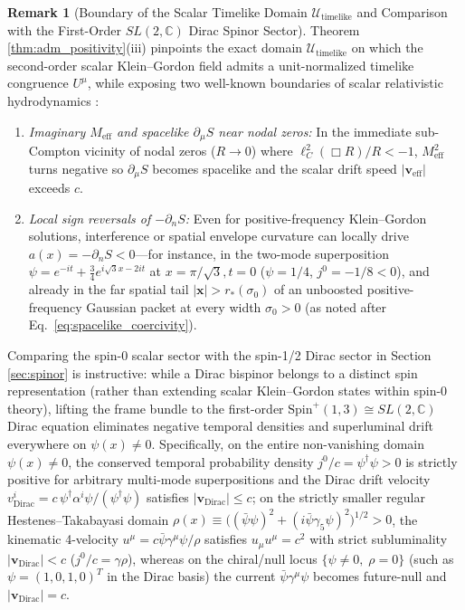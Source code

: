 \documentclass[11pt, a4paper]{article}
\theoremstyle{definition}
\newtheorem{remark}[theorem]{Remark}
\begin{document}
\begin{remark}[Boundary of the Scalar Timelike Domain $\mathcal{U}_{\text{timelike}}$ and Comparison with the First-Order $SL(2,\mathbb{C})$ Dirac Spinor Sector]
\label{rem:subcompton_spinor_bridge}
\label{rem:compton_spinor_bridge}
Theorem \ref{thm:adm_positivity}(iii) pinpoints the exact domain $\mathcal{U}_{\text{timelike}}$ on which the second-order scalar Klein--Gordon field admits a unit-normalized timelike congruence $U^\mu$, while exposing two well-known boundaries of scalar relativistic hydrodynamics \cite{Takabayasi1952, Bohm1952}:
\begin{enumerate}[label=\arabic*., nosep]
    \item \textit{Imaginary $M_{\text{eff}}$ and spacelike $\partial_\mu S$ near nodal zeros:} In the immediate sub-Compton vicinity of nodal zeros ($R \to 0$) where $\ell_C^2(\Box R)/R < -1$, $M_{\text{eff}}^2$ turns negative so $\partial_\mu S$ becomes spacelike and the scalar drift speed $|\mathbf{v}_{\text{eff}}|$ exceeds $c$.
    \item \textit{Local sign reversals of $-\partial_n S$:} Even for positive-frequency Klein--Gordon solutions, interference or spatial envelope curvature can locally drive $a(x) = -\partial_n S < 0$---for instance, in the two-mode superposition $\psi = e^{-it} + \frac{3}{4}e^{i\sqrt{3}x - 2it}$ at $x = \pi/\sqrt{3}, t = 0$ ($\psi = 1/4$, $j^0 = -1/8 < 0$), and already in the far spatial tail $|\mathbf{x}| > r_*(\sigma_0)$ of an unboosted positive-frequency Gaussian packet at every width $\sigma_0 > 0$ (as noted after Eq.~\eqref{eq:spacelike_coercivity}).
\end{enumerate}
Comparing the spin-0 scalar sector with the spin-1/2 Dirac sector in Section \ref{sec:spinor} is instructive: while a Dirac bispinor belongs to a distinct spin representation (rather than extending scalar Klein--Gordon states within spin-0 theory), lifting the frame bundle to the first-order $\text{Spin}^+(1,3) \cong SL(2,\mathbb{C})$ Dirac equation eliminates negative temporal densities and superluminal drift everywhere on $\psi(x) \neq 0$. Specifically, on the entire non-vanishing domain $\psi(x) \neq 0$, the conserved temporal probability density $j^0/c = \psi^\dagger\psi > 0$ is strictly positive for arbitrary multi-mode superpositions and the Dirac drift velocity $v^i_{\text{Dirac}} = c\,\psi^\dagger\alpha^i\psi/(\psi^\dagger\psi)$ satisfies $|\mathbf{v}_{\text{Dirac}}| \le c$; on the strictly smaller regular Hestenes--Takabayasi domain $\rho(x) \equiv \big((\bar{\psi}\psi)^2 + (i\bar{\psi}\gamma_5\psi)^2\big)^{1/2} > 0$, the kinematic 4-velocity $u^\mu = c\bar{\psi}\gamma^\mu\psi / \rho$ satisfies $u_\mu u^\mu = c^2$ with strict subluminality $|\mathbf{v}_{\text{Dirac}}| < c$ ($j^0/c = \gamma\rho$), whereas on the chiral/null locus $\{\psi \neq 0,\; \rho = 0\}$ (such as $\psi = (1, 0, 1, 0)^T$ in the Dirac basis) the current $\bar{\psi}\gamma^\mu\psi$ becomes future-null and $|\mathbf{v}_{\text{Dirac}}| = c$.
\end{remark}
\end{document}
